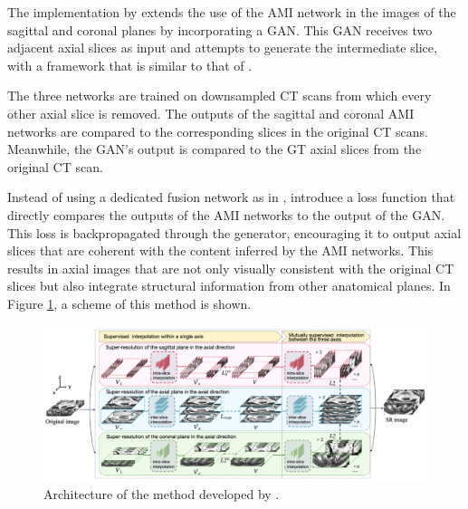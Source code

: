 \par
The implementation by \textcite{Zhang2024} extends the use of the AMI network in the images of the sagittal and coronal planes by incorporating a GAN. This GAN receives two adjacent axial slices as input and attempts to generate the intermediate slice, with a framework that is similar to that of \textcite{Lopez2023}.
\par
The three networks are trained on downsampled CT scans from which every other axial slice is removed. The outputs of the sagittal and coronal AMI networks are compared to the corresponding slices in the original CT scans. Meanwhile, the GAN's output is compared to the GT axial slices from the original CT scan.
\par
Instead of using a dedicated fusion network as in \textcite{Peng2020}, \textcite{Zhang2024} introduce a loss function that directly compares the outputs of the AMI networks to the output of the GAN. This loss is backpropagated through the generator, encouraging it to output axial slices that are coherent with the content inferred by the AMI networks. This results in axial images that are not only visually consistent with the original CT slices but also integrate structural information from other anatomical planes. In Figure \ref{fig:ZhangFramework}, a scheme of this method is shown.

\begin{figure}[!ht]
	\hspace*{-0.35in}
	\includegraphics[width=1.1\linewidth]{figures/ZhangFramework.png}
	\caption{Architecture of the method developed by \textcite{Zhang2024}.}
	\label{fig:ZhangFramework}
\end{figure}

